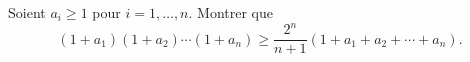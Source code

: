 Soient $a_i \geq 1$ pour $i = 1, \ldots, n$. Montrer que
\[ (1 + a_1)(1 + a_2) \cdots (1 + a_n) \geq \frac{2^n}{n + 1}(1 + a_1 + a_2 + \cdots + a_n). \]
